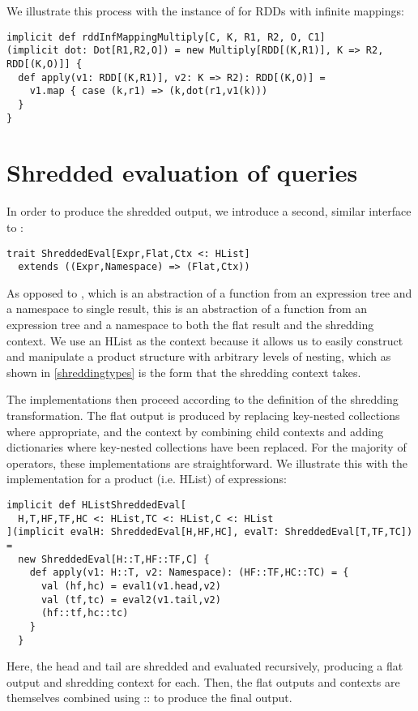 \vs
We illustrate this process with the instance of  for RDDs with infinite mappings:
\vs\begin{lstlisting}
implicit def rddInfMappingMultiply[C, K, R1, R2, O, C1]
(implicit dot: Dot[R1,R2,O]) = new Multiply[RDD[(K,R1)], K => R2, RDD[(K,O)]] {
  def apply(v1: RDD[(K,R1)], v2: K => R2): RDD[(K,O)] =
    v1.map { case (k,r1) => (k,dot(r1,v1(k)))
  }
}
\end{lstlisting}\vs
 
\section{Shredded evaluation of queries}

In order to produce the shredded output, we introduce a second, similar interface to :
\vs\begin{lstlisting}
trait ShreddedEval[Expr,Flat,Ctx <: HList]
  extends ((Expr,Namespace) => (Flat,Ctx))
\end{lstlisting}\vs
As opposed to , which is an abstraction of a function from an expression tree and a namespace to single result, this is an abstraction of a function from an expression tree and a namespace to both the flat result and the shredding context. We use an HList as the context because it allows us to easily construct and manipulate a product structure with arbitrary levels of nesting, which as shown in \ref{shreddingtypes} is the form that the shredding context takes.

The implementations then proceed according to the definition of the shredding transformation. The flat output is produced by replacing key-nested collections where appropriate, and the context by combining child contexts and adding dictionaries where key-nested collections have been replaced. For the majority of operators, these implementations are straightforward. We illustrate this with the implementation for a product (i.e. HList) of expressions:
\vs\begin{lstlisting}
implicit def HListShreddedEval[
  H,T,HF,TF,HC <: HList,TC <: HList,C <: HList
](implicit evalH: ShreddedEval[H,HF,HC], evalT: ShreddedEval[T,TF,TC]) =
  new ShreddedEval[H::T,HF::TF,C] {
    def apply(v1: H::T, v2: Namespace): (HF::TF,HC::TC) = {
      val (hf,hc) = eval1(v1.head,v2)
      val (tf,tc) = eval2(v1.tail,v2)
      (hf::tf,hc::tc)
    }
  }
\end{lstlisting}\vs
Here, the head and tail are shredded and evaluated recursively, producing a flat output and shredding context for each. Then, the flat outputs and contexts are themselves combined using :: to produce the final output.

